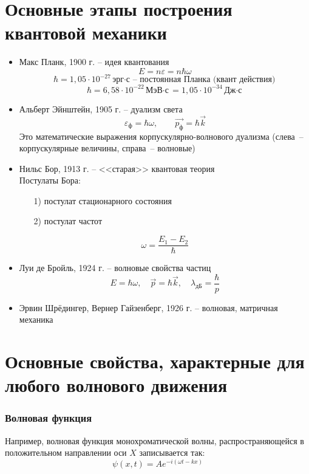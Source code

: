 \section{Основные этапы построения квантовой механики}
\begin{itemize}
  \item Макс Планк, 1900 г. -- идея квантования
$$
E=n\varepsilon = n\hbar\omega
$$
$$
\hbar = 1,05\cdot10^{-27} \text{эрг$\cdot$с -- постоянная Планка (квант действия)}
$$
$$
\hbar = 6,58\cdot10^{-22}\text{МэВ$\cdot$с}=1,05\cdot10^{-34}\text{Дж$\cdot$с}
$$
  \item Альберт Эйнштейн, 1905 г. -- дуализм света
$$
\varepsilon_{\text{ф}}=\hbar\omega, \qquad  \vec{p_{\text{ф}}}=\hbar\vec{k}
$$
Это математические выражения корпускулярно-волнового дуализма (слева~-- корпускулярные величины, справа~-- волновые)
\\
  \item Нильс Бор, 1913 г. -- <<старая>> квантовая теория\\
Постулаты Бора:
\begin{itemize}
\item[1)] постулат стационарного состояния
\item[2)] постулат частот
\end{itemize}
$$
\omega = \frac{E_1-E_2}{\hbar}
$$ 
 \item Луи де Бройль, 1924 г. -- волновые свойства частиц\\
$$
E=\hbar\omega, \quad \vec{p}=\hbar\vec{k}, \quad \lambda_{\text{дБ}}=\frac{\hbar}{p}
$$
  \item Эрвин Шрёдингер, Вернер Гайзенберг, 1926 г. -- волновая, матричная механика
\end{itemize}

\section{Основные свойства, характерные для любого волнового движения}

\subsubsection{Волновая функция}
Например, волновая функция монохроматической волны, распространяющейся в положительном направлении оси $X$ записывается так:
$$
\psi (x, t) = Ae^{-i(\omega t-kx)}
$$

